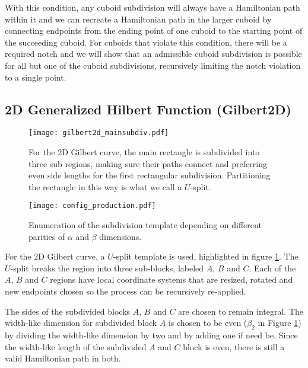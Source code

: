With this condition, any cuboid subdivision will always have a Hamiltonian path within it and we can recreate a Hamiltonian
path in the larger cuboid by connecting endpoints from the ending point of one cuboid to the starting point of the succeeding cuboid.
For cuboids that violate this condition, there will be a required notch and we will show that an admissible cuboid subdivision is possible
for all but one of the cuboid subdivisions, recursively limiting the notch violation to a single point.




\subsection{2D Generalized Hilbert Function (Gilbert2D)}

\begin{figure}[h]
  \centering
  \texttt{[image: gilbert2d\_mainsubdiv.pdf]}
  \caption{ For the 2D Gilbert curve, the main rectangle is subdivided into three sub regions, making sure their paths connect
            and preferring even side lengths for the first rectangular subdivision.
            Partitioning the rectangle in this way is what we call a $U$-split.  }
  \label{fig:main2dsubdiv}
\end{figure}


\begin{figure*}[ht]
  \centering
  \texttt{[image: config\_production.pdf]}
  \caption{ Enumeration of the subdivision template depending on different parities of $\alpha$ and $\beta$ dimensions. }
  \label{fig:production2d}
\end{figure*}

For the 2D Gilbert curve, a $U$-split template is used, highlighted in figure \ref{fig:main2dsubdiv}.
The $U$-split breaks the region into three sub-blocks, labeled $A$, $B$ and $C$.
Each of the $A$, $B$ and $C$ regions have local coordinate systems that are resized, rotated and
new endpoints chosen so the process can be recursively re-applied.

The sides of the subdivided blocks $A$, $B$ and $C$ are chosen to remain integral.
The width-like dimension for subdivided block $A$ is chosen to be even ($\beta_2$ in Figure \ref{fig:main2dsubdiv})
by dividing the width-like dimension by two and by adding one if need be.
Since the width-like length of the subdivided $A$ and $C$ block is even, there is still a valid Hamiltonian path 
in both.

